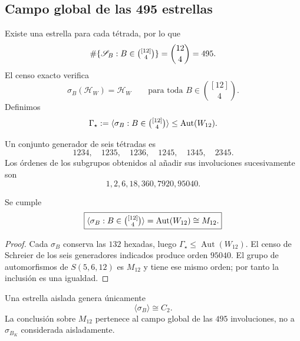 \subsection{Campo global de las 495 estrellas}

Existe una estrella para cada tétrada, por lo que
\begin{equation}
 \#\{\mathscr S_B:B\in\tbinom{[12]}4\}
 =\binom{12}{4}=495.
 \label{p12-83-c20-s2:eq:numero-estrellas-witt}
\end{equation}
El censo exacto verifica
\begin{equation}
 \sigma_B(\mathcal H_W)=\mathcal H_W
 \qquad
 \text{para toda }B\in\binom{[12]}4.
 \label{p12-83-c20-s2:eq:estrellas-conservan-hexadas}
\end{equation}
Definimos
\begin{equation}
 \Gamma_\star
 :=\langle\sigma_B:B\in\tbinom{[12]}4\rangle
 \leq\operatorname{Aut}(W_{12}).
 \label{p12-83-c20-s2:eq:grupo-generado-estrellas-witt}
\end{equation}

Un conjunto generador de seis tétradas es
\[
 1234,
 \quad1235,
 \quad1236,
 \quad1245,
 \quad1345,
 \quad2345.
\]
Los órdenes de los subgrupos obtenidos al añadir sus involuciones
sucesivamente son
\begin{equation}
 1, 2, 6, 18, 360, 7920, 95040.
 \label{p12-83-c20-s2:eq:cadena-ordenes-generadores-m12}
\end{equation}

\begin{theorem}
\label{p12-83-c20-s2:thm:495-estrellas-m12-autonomo}
Se cumple
\begin{equation}
 \boxed{
 \langle\sigma_B:B\in\tbinom{[12]}4\rangle
 =\operatorname{Aut}(W_{12})
 \cong M_{12}.}
 \label{p12-83-c20-s2:eq:estrellas-generan-m12}
\end{equation}
\end{theorem}

\begin{proof}
Cada \(\sigma_B\) conserva las \(132\) hexadas, luego
\(\Gamma_\star\leq\operatorname{Aut}(W_{12})\). El censo de Schreier de
los seis generadores indicados produce orden \(95040\). El grupo de
automorfismos de \(S(5,6,12)\) es \(M_{12}\) y tiene ese mismo orden; por
tanto la inclusión es una igualdad.
\end{proof}

Una estrella aislada genera únicamente
\[
 \langle\sigma_B\rangle\cong C_2.
\]
La conclusión sobre \(M_{12}\) pertenece al campo global de las
\(495\) involuciones, no a \(\sigma_{B_K}\) considerada aisladamente.

